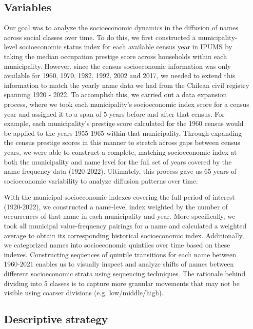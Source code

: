 \subsection{Variables}
Our goal was to analyze the socioeconomic dynamics in the diffusion of names across social classes over time. To do this, we first constructed a municipality-level socioeconomic status index for each available census year in IPUMS by taking the median occupation prestige score across households within each municipality. However, since the census socioeconomic information was only available for 1960, 1970, 1982, 1992, 2002 and 2017, we needed to extend this information to match the yearly name data we had from the Chilean civil registry spanning 1920 - 2022. To accomplish this, we carried out a data expansion process, where we took each municipality's socioeconomic index score for a census year and assigned it to a span of 5 years before and after that census. For example, each municipality's prestige score calculated for the 1960 census would be applied to the years 1955-1965 within that municipality. Through expanding the census prestige scores in this manner to stretch across gaps between census years, we were able to construct a complete, matching socioeconomic index at both the municipality and name level for the full set of years covered by the name frequency data (1920-2022). Ultimately, this process gave us 65 years of socioeconomic variability to analyze diffusion patterns over time.
\bigskip

With the municipal socioeconomic indexes covering the full period of interest (1920-2022), we constructed a name-level index weighted by the number of occurrences of that name in each municipality and year. More specifically, we took all municipal value-frequency pairings for a name and calculated a weighted average to obtain its corresponding historical socioeconomic index. Additionally, we categorized names into socioeconomic quintiles over time based on these indexes. Constructing sequences of quintile transitions for each name between 1960-2021 enables us to visually inspect and analyze shifts of names between different socioeconomic strata using sequencing techniques. The rationale behind dividing into 5 classes is to capture more granular movements that may not be visible using coarser divisions (e.g. low/middle/high).

\subsection{Descriptive strategy}


